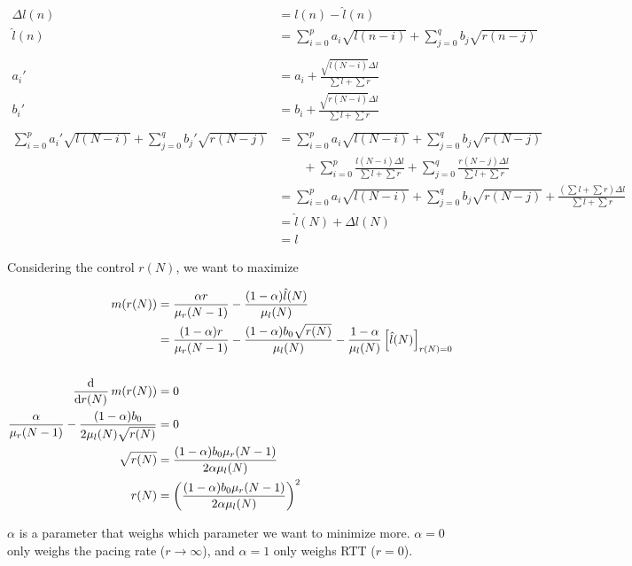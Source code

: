 \documentclass[12pt]{article}
\begin{document}
\begin{align*}
    \Delta{l}(n) &= l(n) - \hat{l}(n)\\
    \hat{l}(n) &= \sum_{i = 0}^p a_i \sqrt{l(n - i)} + \sum_{j = 0}^q b_j \sqrt{r(n - j)}\\
    \\
    a_i' &= a_i + \frac{\sqrt{l(N - i)} \Delta{l}}{\sum l + \sum r}\\
    b_i' &= b_i + \frac{\sqrt{r(N - i)} \Delta{l}}{\sum l + \sum r}\\
    \\
    \sum_{i = 0}^p a_i' \sqrt{l(N - i)} + \sum_{j = 0}^q b_j' \sqrt{r(N - j)} &=
    \sum_{i = 0}^p a_i \sqrt{l(N - i)} + \sum_{j = 0}^q b_j \sqrt{r(N - j)}\\
    &\qquad + \sum_{i = 0}^p \frac{l(N - i) \Delta{l}}{\sum l + \sum r}
    + \sum_{j = 0}^q \frac{r(N - j) \Delta{l}}{\sum l + \sum r}\\
    &= \sum_{i = 0}^p a_i \sqrt{l(N - i)} + \sum_{j = 0}^q b_j \sqrt{r(N - j)}
    + \frac{(\sum l + \sum r) \Delta{l}}{\sum l + \sum r}\\
    &= \hat{l}(N) + \Delta{l}(N)\\
    &= l
\end{align*}

Considering the control $r(N)$, we want to maximize

\begin{align*}
    m(r(N)) &= \frac{\alpha r}{\mu_r(N - 1)} - \frac{(1 - \alpha) \hat{l}(N)}{\mu_l(N)}\\
    &= \frac{(1 - \alpha) r}{\mu_r(N - 1)}
    - \frac{(1 - \alpha) b_0 \sqrt{r(N)}}{\mu_l(N)}
    - \frac{1 - \alpha}{\mu_l(N)} \sbr{\hat{l}(N)}_{r(N) = 0}\\
    \\
    \dod{}{r(N)} m(r(N)) &= 0\\
    \frac{\alpha}{\mu_r(N - 1)} - \frac{(1 - \alpha) b_0}{2\mu_l(N) \sqrt{r(N)}} &= 0\\
    \sqrt{r(N)} &= \frac{(1 - \alpha) b_0 \mu_r(N - 1)}{2 \alpha \mu_l(N)}\\
    r(N) &= \del{\frac{(1 - \alpha) b_0 \mu_r(N - 1)}{2 \alpha \mu_l(N)}}^2
\end{align*}

$\alpha$ is a parameter that weighs which parameter we want to minimize more.
$\alpha = 0$ only weighs the pacing rate ($r \to \infty$), and $\alpha = 1$
only weighs RTT ($r = 0$).

\pagebreak
\end{document}

